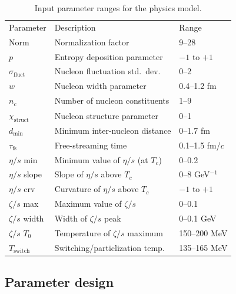 \documentclass[aps,prc,reprint,amsmath,nofootinbib]{revtex4-1}
\newcommand{\sigmaf}{\sigma_\text{fluct}}
\newcommand{\X}{\chi_\text{struct}}
\newcommand{\taufs}{\tau_\text{fs}}
\newcommand{\dmin}{d_\text{min}}
\newcommand{\paddedhline}{\noalign{\smallskip}\hline\noalign{\smallskip}}
\begin{document}
\begin{table}[t]
  \caption{Input parameter ranges for the physics model.}
  \begin{ruledtabular}
  \begin{tabular}{lll}
    Parameter         & Description                        & Range             \\
    \paddedhline
    Norm              & Normalization factor                 & 9--28           \\
    $p$               & Entropy deposition parameter         & $-1$ to $+1$    \\
    $\sigmaf$         & Nucleon fluctuation std.\ dev.\      & 0--2            \\
    $w$               & Nucleon width parameter              & 0.4--1.2 fm     \\
    $n_c$             & Number of nucleon constituents       & 1--9            \\
    $\X$              & Nucleon structure parameter          & 0--1            \\
    $\dmin$           & Minimum inter-nucleon distance       & 0--1.7 fm       \\
    $\taufs$          & Free-streaming time                  & 0.1--1.5 fm/$c$ \\
    $\eta/s$ min      & Minimum value of $\eta/s$ (at $T_c$) & 0--0.2          \\
    $\eta/s$ slope    & Slope of $\eta/s$ above $T_c$        & 0--8 GeV$^{-1}$ \\
    $\eta/s$ crv      & Curvature of $\eta/s$ above $T_c$    & $-1$ to $+1$    \\
    $\zeta/s$ max     & Maximum value of $\zeta/s$           & 0--0.1          \\
    $\zeta/s$ width   & Width of $\zeta/s$ peak              & 0--0.1 GeV      \\
    $\zeta/s$ $T_0$   & Temperature of $\zeta/s$ maximum     & 150--200 MeV    \\
    $T_\text{switch}$ & Switching/particlization temp.       & 135--165 MeV    \\
  \end{tabular}
  \end{ruledtabular}
  \label{tab:design}
\end{table}

\subsection{Parameter design}
\end{document}
